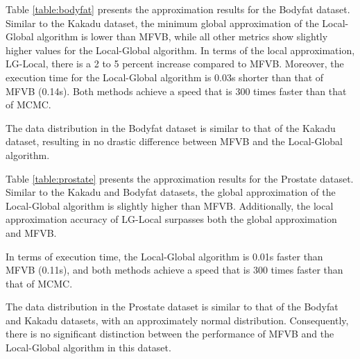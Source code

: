 Table \ref{table:bodyfat} presents the approximation results for the Bodyfat dataset. Similar to the Kakadu dataset, the minimum global approximation of the Local-Global algorithm is lower than MFVB, while all other metrics show slightly higher values for the Local-Global algorithm. In terms of the local approximation, LG-Local, there is a 2 to 5 percent increase compared to MFVB. Moreover, the execution time for the Local-Global algorithm is 0.03s shorter than that of MFVB (0.14s). Both methods achieve a speed that is 300 times faster than that of MCMC.

The data distribution in the Bodyfat dataset is similar to that of the Kakadu dataset, resulting in no drastic difference between MFVB and the Local-Global algorithm.

\begin{table}[!h]
	\caption{Experiment Result on Prostate dataset}
	\label{table:prostate}
\end{table}

Table \ref{table:prostate} presents the approximation results for the Prostate dataset. Similar to the Kakadu and Bodyfat datasets, the global approximation of the Local-Global algorithm is slightly higher than MFVB. Additionally, the local approximation accuracy of LG-Local surpasses both the global approximation and MFVB.

In terms of execution time, the Local-Global algorithm is 0.01s faster than MFVB (0.11s), and both methods achieve a speed that is 300 times faster than that of MCMC.

The data distribution in the Prostate dataset is similar to that of the Bodyfat and Kakadu datasets, with an approximately normal distribution. Consequently, there is no significant distinction between the performance of MFVB and the Local-Global algorithm in this dataset.

